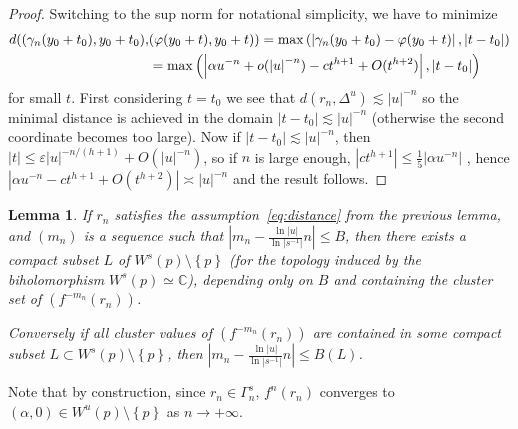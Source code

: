 \documentclass[11pt, oneside]{amsart}
\newcommand{\C}{\mathbb{C}}
\newcommand{\e}{\varepsilon}
\newcommand{\set}[1]{\left\{#1\right\}}
\newcommand{\abs}[1]{\left\vert#1\right\vert}
\newcommand{\unsur}[1]{\frac{1}{#1}}
\newcommand{\lrpar}[1]{\left(#1\right)}
\newcommand{\inv}{^{-1}}
\newtheorem{lem}[prop] {Lemma}
\theoremstyle{remark}
\theoremstyle{definition}
\theoremstyle{theorem}
\begin{document}
 
\begin{proof}
Switching to the sup norm for notational simplicity, we have to minimize 
\begin{align}
\notag d((\gamma_n(y_0+t_0), y_0+t_0),  &(\varphi(y_0+t), y_0+t)) = 
\max\lrpar{ \abs{\gamma_n(y_0+t_0) - \varphi(y_0+t)}, \abs{t- t_0}} \\ & = 
 \max\lrpar{ \abs{\alpha u^{-n} +o(\abs{u}^{-n})  - c t^{h+1} + O(t^{h+2})  }, \abs{t- t_0}} 
\end{align}
for small $t$. First considering  $t=t_0$ we see that 
$d(r_n, \Delta^u)\lesssim  \abs{u}^{-n}$ so the minimal distance is achieved in the domain 
$\abs{t-t_0}\lesssim \abs{u}^{- n}$ (otherwise the second coordinate becomes too large). Now if 
$\abs{t-t_0}\lesssim \abs{u}^{- n}$, then $\abs{t} \leq \e \abs{u}^{-n/(h+1)} + O(\abs{u}^{-n})$, so 
if $n$ is large enough, 
$\abs{ct^{h+1}}\leq \unsur{5}\abs{\alpha u^{-n}}$ , hence  
$ \abs{\alpha u^{-n} - c t^{h+1} + O(t^{h+2})}  \asymp \abs{u}^{-n} $ and the result follows. 
\end{proof}
 
\begin{lem}\label{lem:compact}
If $r_n$ satisfies the assumption~\eqref{eq:distance} from  the previous lemma, and 
$(m_n)$ is a sequence such that $\abs{m_n  - \frac{\ln{\abs{u}}}{\ln\abs{s\inv}} n}\leq B$, then 
there exists a compact subset $L$ of  $W^s(p)\setminus \set{p}$ (for the   topology induced by the biholomorphism $W^s(p)\simeq \C$), depending only on $B$ and 
 containing the  cluster set of $(f^{-m_n}(r_n))$. 

Conversely if all cluster values of $(f^{-m_n}(r_n))$ are contained 
in some compact subset $L \subset W^s(p)\setminus \set{p}$, then 
$\abs{m_n  - \frac{\ln{\abs{u}}}{\ln\abs{s\inv}} n}\leq B(L)$.
\end{lem}
 
Note that by construction, since $r_n\in \Gamma^s_n$, 
 $f^n(r_n)$ converges to $(\alpha, 0) \in W^u(p)\setminus \set{p}$ as $n\to+\infty$.  
 
\end{document}

